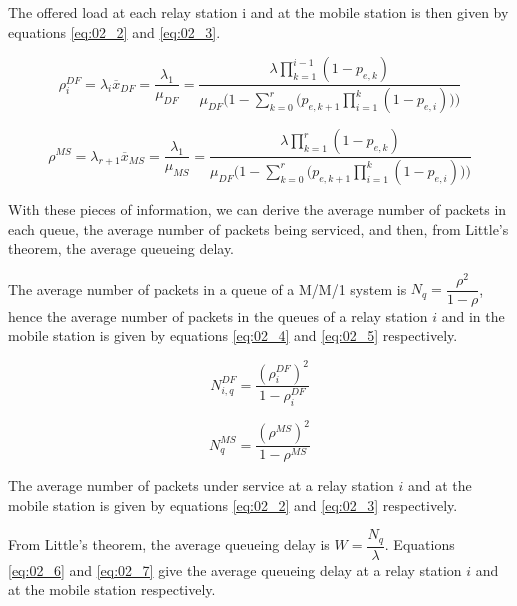 The offered load at each relay station i and at the mobile station is then given
by equations \ref{eq:02_2} and \ref{eq:02_3}.

\begin{equation}
  \rho_i^{DF} = \lambda_i \overline{x}_{DF} = \dfrac{\lambda_1}{\mu_{DF}} =
  \dfrac{\lambda \prod\limits_{k=1}^{i-1} (1 - p_{e,k})}{\mu_{DF}\Bigg(1 - \sum\limits_{k=0}^r \Big(p_{e,k+1} \prod\limits_{i=1}^k (1 - p_{e,i})\Big)\Bigg)}
  \label{eq:02_2}
\end{equation}

\begin{equation}
  \rho^{MS} = \lambda_{r+1} \overline{x}_{MS} = \dfrac{\lambda_1}{\mu_{MS}} =
  \dfrac{\lambda \prod\limits_{k=1}^{r} (1 - p_{e,k})}{\mu_{DF}\Bigg(1 - \sum\limits_{k=0}^r \Big(p_{e,k+1} \prod\limits_{i=1}^k (1 - p_{e,i})\Big)\Bigg)}
  \label{eq:02_3}
\end{equation}











With these pieces of information, we can derive the average number of packets
in each queue, the average number of packets being serviced, and then, from
Little's theorem, the average queueing delay.

The average number of packets in a queue of a M/M/1 system is
$N_q = \dfrac{\rho^2}{1-\rho}$, hence the average number of packets in the queues
of a relay station $i$ and in the mobile station is given by equations
\ref{eq:02_4} and \ref{eq:02_5} respectively.

\begin{equation}
  N_{i,q}^{DF} = \dfrac{(\rho_i^{DF})^2}{1 - \rho_i^{DF}}
  \label{eq:02_4}
\end{equation}

\begin{equation}
  N_q^{MS} = \dfrac{(\rho^{MS})^2}{1 - \rho^{MS}}
  \label{eq:02_5}
\end{equation}

The average number of packets under service at a relay station $i$ and at the
mobile station is given by equations \ref{eq:02_2} and \ref{eq:02_3} respectively.

From Little's theorem, the average queueing delay is $W = \dfrac{N_q}{\lambda}$.
Equations \ref{eq:02_6} and \ref{eq:02_7} give the average queueing delay at a
relay station $i$ and at the mobile station respectively.

